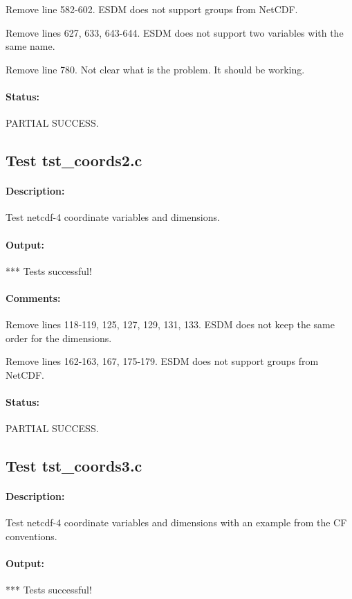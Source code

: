 Remove line 582-602. ESDM does not support groups from NetCDF.

Remove lines 627, 633, 643-644. ESDM does not support two variables with the same name.

Remove line 780. Not clear what is the problem. It should be working.

\paragraph{Status:} PARTIAL SUCCESS.

\subsection{Test tst\_coords2.c}

\paragraph{Description:} Test netcdf-4 coordinate variables and dimensions.

\paragraph{Output:} *** Tests successful!

\paragraph{Comments:} Remove lines 118-119, 125, 127, 129, 131, 133. ESDM does not keep the same order for the dimensions.

Remove lines 162-163, 167, 175-179. ESDM does not support groups from NetCDF.

\paragraph{Status:} PARTIAL SUCCESS.

\subsection{Test tst\_coords3.c}

\paragraph{Description:} Test netcdf-4 coordinate variables and dimensions with an example from the CF conventions.

\paragraph{Output:} *** Tests successful!

